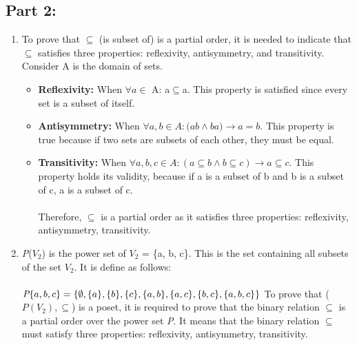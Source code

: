 \subsection{Part 2:}
\begin{enumerate}
    \item To prove that $\subseteq$ (is subset of) is a partial order, it is needed to indicate that $\subseteq$ satisfies three properties: reflexivity, antisymmetry, and transitivity. Consider A is the domain of sets.
    \begin{itemize}
        \item \textbf{Reflexivity: } When $\forall a \in$ A: a$\subseteq$a. This property is satisfied since every set is a subset of itself.    
        \item \textbf{Antisymmetry: } When $\forall a, b \in A: (a$\subseteq$b \wedge b$\subseteq$a) \rightarrow a = b$. This property is true because if two sets are subsets of each other, they must be equal.
        \item \textbf{Transitivity:} When $\forall a, b, c \in A: (a\subseteq b \wedge b\subseteq c) \rightarrow a\subseteq c$. This property holds its validity, because if a is a subset of b and b is a subset of c, a is a subset of c. \\ \\
        Therefore, $\subseteq$ is a partial order as it satisfies three properties: reflexivity, antisymmetry, transitivity.
    \end{itemize}
    \item \textit{P}($V_{2}$) is the power set of $V_{2}$ = \{a, b, c\}. This is the set containing all subsets of the set $V_{2}$. It is define as follows:\\ \\
    $\textit{P}\{a, b, c\} = \\
    \{ \\
    \emptyset, \\
    \{a\}, \{b\}, \{c\},\\
    \{a, b\}, \{a, c\}, \{b, c\},\\
    \{a, b, c\}\\
    \}\\ \\$
    To prove that ($\textit{P}(V_{2}), \subseteq$) is a poset, it is required to prove that the binary relation $\subseteq$ is a partial order over the power set \textit{P}. It means that the binary relation $\subseteq$ must satisfy three properties: reflexivity, antisymmetry, transitivity.
    \begin{itemize}

\end{itemize}
\end{enumerate}
